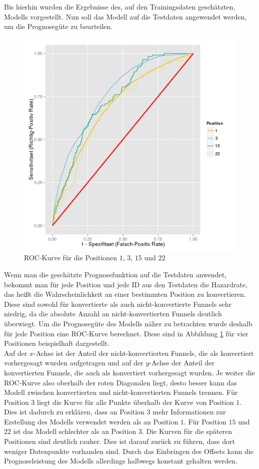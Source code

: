 Bis hierhin wurden die Ergebnisse des, auf den Trainingsdaten geschätzten, Modells vorgestellt. Nun soll das Modell auf die Testdaten angewendet werden, um die Prognosegüte zu beurteilen.
\begin{figure}[H]
	\centering\includegraphics[scale=0.6]{roc.png}\caption[ROC-Kurve]{ROC-Kurve für die Positionen $1$, $3$, $15$ und $22$}\label{roc}
\end{figure}
\noindent Wenn man die geschätzte Prognosefunktion auf die Testdaten anwendet, bekommt man für jede Position und jede ID aus den Testdaten die Hazardrate, das heißt die Wahrscheinlichkeit an einer bestimmten Position zu konvertieren. Diese sind sowohl für konvertierte als auch nicht-konvertierte Funnels sehr niedrig, da die absolute Anzahl an nicht-konvertierten Funnels deutlich überwiegt. Um die Prognosegüte des Modells näher zu betrachten wurde deshalb für jede Position eine ROC-Kurve berechnet. Diese sind in Abbildung \ref{roc} für vier Positionen beispielhaft dargestellt.\\
Auf der $x$-Achse ist der Anteil der nicht-konvertierten Funnels, die als konvertiert vorhergesagt wurden aufgetragen und auf der $y$-Achse der Anteil der konvertierten Funnels, die auch als konvertiert vorhergesagt wurden. Je weiter die ROC-Kurve also oberhalb der roten Diagonalen liegt, desto besser kann das Modell zwischen konvertierten und nicht-konvertierten Funnels trennen. Für Position $3$ liegt die Kurve für alle Punkte überhalb der Kurve von Position $1$. Dies ist dadurch zu erklären, dass an Position $3$ mehr Informationen zur Erstellung des Modells verwendet werden als an Position $1$. Für Position $15$ und $22$ ist das Modell schlechter als an Position $3$. Die Kurven für die späteren Positionen sind deutlich rauher. Dies ist darauf zurück zu führen, dass dort weniger Datenpunkte vorhanden sind. Durch das Einbringen des Offsets kann die Prognoseleistung des Modells allerdings halbwegs konstant gehalten werden.\\
